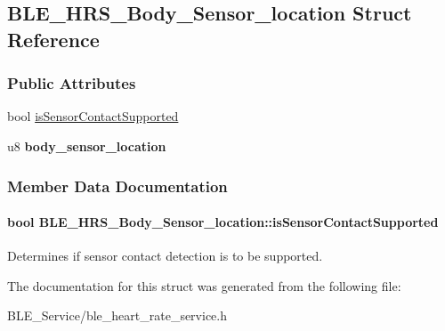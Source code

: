 \hypertarget{struct_b_l_e___h_r_s___body___sensor__location}{}\subsection{B\+L\+E\+\_\+\+H\+R\+S\+\_\+\+Body\+\_\+\+Sensor\+\_\+location Struct Reference}
\label{struct_b_l_e___h_r_s___body___sensor__location}
\subsubsection*{Public Attributes}
\begin{DoxyCompactItemize}
\item 
bool \hyperlink{struct_b_l_e___h_r_s___body___sensor__location_ac8d5cd50feb66ce2f4f554807186596e}{is\+Sensor\+Contact\+Supported}
\item 
u8 {\bfseries body\+\_\+sensor\+\_\+location}\hypertarget{struct_b_l_e___h_r_s___body___sensor__location_a805d99c906162e22734343ab73bd5b3a}{}\label{struct_b_l_e___h_r_s___body___sensor__location_a805d99c906162e22734343ab73bd5b3a}

\end{DoxyCompactItemize}


\subsubsection{Member Data Documentation}
\paragraph[{\texorpdfstring{is\+Sensor\+Contact\+Supported}{isSensorContactSupported}}]{\setlength{\rightskip}{0pt plus 5cm}bool B\+L\+E\+\_\+\+H\+R\+S\+\_\+\+Body\+\_\+\+Sensor\+\_\+location\+::is\+Sensor\+Contact\+Supported}\hypertarget{struct_b_l_e___h_r_s___body___sensor__location_ac8d5cd50feb66ce2f4f554807186596e}{}\label{struct_b_l_e___h_r_s___body___sensor__location_ac8d5cd50feb66ce2f4f554807186596e}
Determines if sensor contact detection is to be supported. 

The documentation for this struct was generated from the following file\+:\begin{DoxyCompactItemize}
\item 
B\+L\+E\+\_\+\+Service/ble\+\_\+heart\+\_\+rate\+\_\+service.\+h\end{DoxyCompactItemize}
